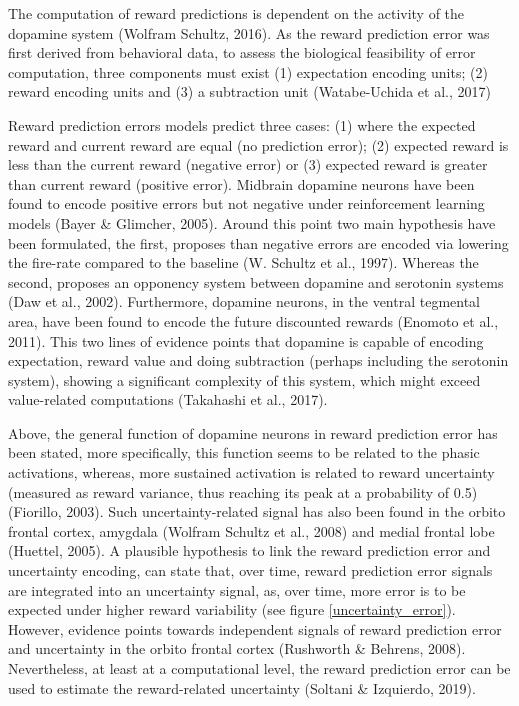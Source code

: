 \documentclass[
]{/home/nicoluarte/Downloads/templates/PNAS-template-main.tex}
\begin{document}
The computation of reward predictions is dependent on the activity of
the dopamine system (Wolfram Schultz, 2016). As the reward prediction
error was first derived from behavioral data, to assess the biological
feasibility of error computation, three components must exist (1)
expectation encoding units; (2) reward encoding units and (3) a
subtraction unit (Watabe-Uchida et al., 2017)

Reward prediction errors models predict three cases: (1) where the
expected reward and current reward are equal (no prediction error); (2)
expected reward is less than the current reward (negative error) or (3)
expected reward is greater than current reward (positive error).
Midbrain dopamine neurons have been found to encode positive errors but
not negative under reinforcement learning models (Bayer \& Glimcher,
2005). Around this point two main hypothesis have been formulated, the
first, proposes than negative errors are encoded via lowering the
fire-rate compared to the baseline (W. Schultz et al., 1997). Whereas
the second, proposes an opponency system between dopamine and serotonin
systems (Daw et al., 2002). Furthermore, dopamine neurons, in the
ventral tegmental area, have been found to encode the future discounted
rewards (Enomoto et al., 2011). This two lines of evidence points that
dopamine is capable of encoding expectation, reward value and doing
subtraction (perhaps including the serotonin system), showing a
significant complexity of this system, which might exceed value-related
computations (Takahashi et al., 2017).

Above, the general function of dopamine neurons in reward prediction
error has been stated, more specifically, this function seems to be
related to the phasic activations, whereas, more sustained activation is
related to reward uncertainty (measured as reward variance, thus
reaching its peak at a probability of 0.5) (Fiorillo, 2003). Such
uncertainty-related signal has also been found in the orbito frontal
cortex, amygdala (Wolfram Schultz et al., 2008) and medial frontal lobe
(Huettel, 2005). A plausible hypothesis to link the reward prediction
error and uncertainty encoding, can state that, over time, reward
prediction error signals are integrated into an uncertainty signal, as,
over time, more error is to be expected under higher reward variability
(see figure \ref{uncertainty_error}). However, evidence points towards
independent signals of reward prediction error and uncertainty in the
orbito frontal cortex (Rushworth \& Behrens, 2008). Nevertheless, at
least at a computational level, the reward prediction error can be used
to estimate the reward-related uncertainty (Soltani \& Izquierdo, 2019).
\end{document}
